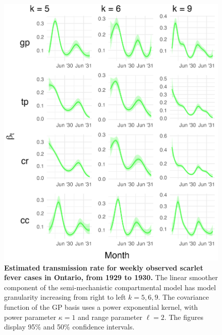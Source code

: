 \documentclass[
11pt, %
oneside, %
english, %
singlespacing, %
]{macthesis} %
\begin{document}
\begin{figure}[H]
\centering
\includegraphics[width=\textwidth, height = \textwidth]{figure/Scarlet/Scarlet_agg_k(5,8,10)_bsd1_beta1_gamma7_sd01_plot_beta.png}
\caption[Estimated Scarlet Fever Transmission Rate (1929-1930)]{\textbf{Estimated transmission rate for weekly observed scarlet fever cases in Ontario, from 1929 to 1930.} The linear smoother component of the semi-mechanistic compartmental model has model granularity increasing from right to left \(k= 5,6,9\). The covariance function of the GP basis uses a power exponential kernel, with power parameter \(\kappa = 1\) and range parameter \(\ell = 2\). The figures display 95\% and 50\% confidence intervals.}
\label{fig:scarlet_trans}
\end{figure}
\end{document}
